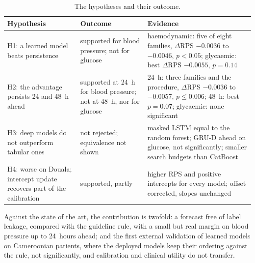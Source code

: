 \begin{table}[htbp]
\centering\footnotesize
\caption{The hypotheses and their outcome.}\label{tab:hypotheses}
\begin{tabularx}{\textwidth}{@{}>{\raggedright\arraybackslash}p{3.6cm} >{\raggedright\arraybackslash}p{3.3cm} X@{}}
\toprule
\textbf{Hypothesis} & \textbf{Outcome} & \textbf{Evidence} \\
\midrule
H1: a learned model beats persistence & supported for blood pressure; not for glucose & haemodynamic: five of eight families, $\Delta$RPS $-0.0036$ to $-0.0046$, $p < 0.05$; glycaemic: best $\Delta$RPS $-0.0055$, $p = 0.14$ \\
H2: the advantage persists 24 and 48~h ahead & supported at 24~h for blood pressure; not at 48~h, nor for glucose & 24~h: three families and the procedure, $\Delta$RPS $-0.0036$ to $-0.0057$, $p \leq 0.006$; 48~h: best $p = 0.07$; glycaemic: none significant \\
H3: deep models do not outperform tabular ones & not rejected; equivalence not shown & masked LSTM equal to the random forest; GRU-D ahead on glucose, not significantly; smaller search budgets than CatBoost \\
H4: worse on Douala; intercept update recovers part of the calibration & supported, partly & higher RPS and positive intercepts for every model; offset corrected, slopes unchanged \\
\bottomrule
\end{tabularx}
\end{table}

Against the state of the art, the contribution is twofold: a forecast free of label leakage, compared with the guideline rule, with a small but real margin on blood pressure up to 24~hours ahead; and the first external validation of learned models on Cameroonian patients, where the deployed models keep their ordering against the rule, not significantly, and calibration and clinical utility do not transfer.
